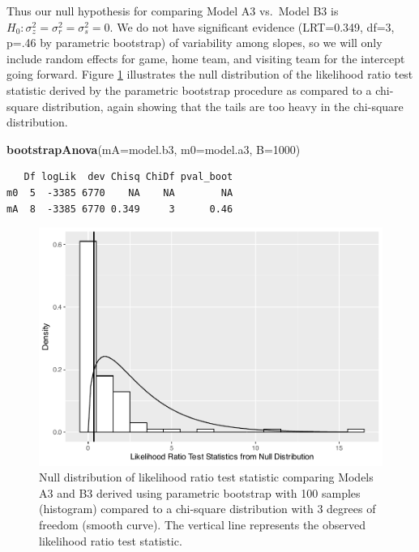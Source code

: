 \documentclass[
]{krantz}
\newenvironment{Shaded}{\begin{snugshade}}{\end{snugshade}}
\newcommand{\DataTypeTok}[1]{\textcolor[rgb]{0.27,0.27,0.27}{#1}}
\newcommand{\DecValTok}[1]{\textcolor[rgb]{0.06,0.06,0.06}{#1}}
\newcommand{\KeywordTok}[1]{\textcolor[rgb]{0.27,0.27,0.27}{\textbf{#1}}}
\newcommand{\NormalTok}[1]{#1}
\begin{document}
Thus our null hypothesis for comparing Model A3 vs.~Model B3 is \(H_{0}: \sigma_{z}^{2}=\sigma_{r}^{2}=\sigma_{s}^{2}=0\). We do not have significant evidence (LRT=0.349, df=3, p=.46 by parametric bootstrap) of variability among slopes, so we will only include random effects for game, home team, and visiting team for the intercept going forward. Figure \ref{fig:gmu-lrt3} illustrates the null distribution of the likelihood ratio test statistic derived by the parametric bootstrap procedure as compared to a chi-square distribution, again showing that the tails are too heavy in the chi-square distribution.

\begin{Shaded}
\begin{Highlighting}[]
\KeywordTok{bootstrapAnova}\NormalTok{(}\DataTypeTok{mA=}\NormalTok{model.b3, }\DataTypeTok{m0=}\NormalTok{model.a3, }\DataTypeTok{B=}\DecValTok{1000}\NormalTok{)}
\end{Highlighting}
\end{Shaded}

\begin{verbatim}
   Df logLik  dev Chisq ChiDf pval_boot
m0  5  -3385 6770    NA    NA        NA
mA  8  -3385 6770 0.349     3      0.46
\end{verbatim}

\begin{figure}

{\centering \includegraphics[width=0.6\linewidth]{bookdown-BeyondMLR_files/figure-latex/gmu-lrt3-1} 

}

\caption{Null distribution of likelihood ratio test statistic comparing Models A3 and B3 derived using parametric bootstrap with 100 samples (histogram) compared to a chi-square distribution with 3 degrees of freedom (smooth curve).  The vertical line represents the observed likelihood ratio test statistic.}\label{fig:gmu-lrt3}
\end{figure}
\end{document}
